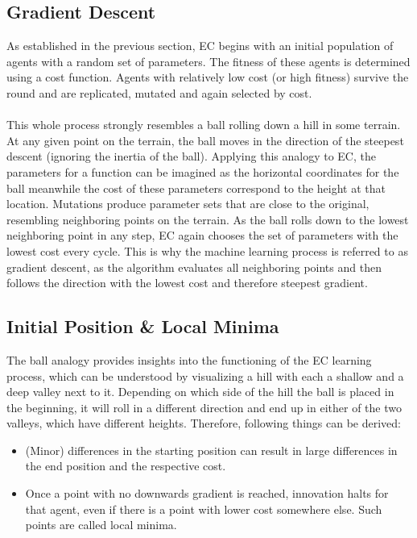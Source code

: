 \subsection{Gradient Descent}\label{subsec:gradient-descent}
As established in the previous section, EC begins with an initial population of agents with a random set of parameters.
The fitness of these agents is determined using a cost function.
Agents with relatively low cost (or high fitness) survive the round and are replicated, mutated and again selected by cost.
\\ \\
This whole process strongly resembles a ball rolling down a hill in some terrain.
At any given point on the terrain, the ball moves in the direction of the steepest descent (ignoring the inertia of the ball).
Applying this analogy to EC, the parameters for a function can be imagined as the horizontal coordinates for the ball meanwhile the cost of these parameters correspond to the height at that location.
Mutations produce parameter sets that are close to the original, resembling neighboring points on the terrain.
As the ball rolls down to the lowest neighboring point in any step, EC again chooses the set of parameters with the lowest cost every cycle.
This is why the machine learning process is referred to as gradient descent, as the algorithm evaluates all neighboring points and then follows the direction with the lowest cost and therefore steepest gradient\cite{ibm2024}.

\subsection{Initial Position \& Local Minima}\label{subsec:initial-position-&-local-minima}
The ball analogy provides insights into the functioning of the EC learning process, which can be understood by visualizing a hill with each a shallow and a deep valley next to it.
Depending on which side of the hill the ball is placed in the beginning, it will roll in a different direction and end up in either of the two valleys, which have different heights.
Therefore, following things can be derived:
\begin{itemize}
    \item (Minor) differences in the starting position can result in large differences in the end position and the respective cost.
    \item Once a point with no downwards gradient is reached, innovation halts for that agent, even if there is a point with lower cost somewhere else.
    Such points are called local minima.
\end{itemize}

